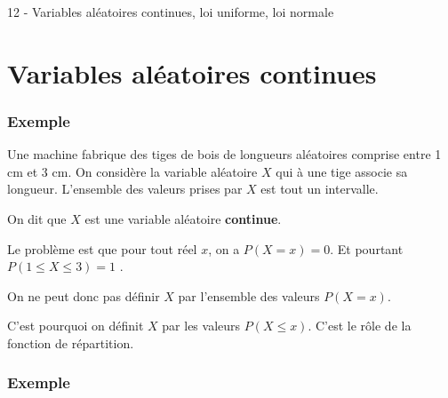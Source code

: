 \documentclass[a4paper,12pt,openany]{book}
\begin{document}
\begin{center}
\begin{huge}
12 - Variables aléatoires continues, loi uniforme, loi normale\end{huge}\end{center}

\section{Variables aléatoires continues}


\subsubsection{Exemple}

Une machine fabrique des tiges de bois de longueurs aléatoires comprise entre 1 cm et 3 cm. On considère la variable aléatoire $X$ qui à une tige associe sa longueur. L'ensemble des valeurs prises par $X$ est tout un intervalle.

 On dit que $X$ est une variable aléatoire \textbf{continue}. 
 
Le problème est que pour tout réel $x$, on a $P(X=x)=0$. Et pourtant $P(1\le X\le3)=1$ .

On ne peut donc pas définir $X$ par l'ensemble des valeurs $P(X=x)$.
 
C'est pourquoi on définit $X$ par les valeurs $P(X\le x)$. C'est le rôle de la fonction de répartition.

\bigskip


\subsubsection{Exemple}
\end{document}
